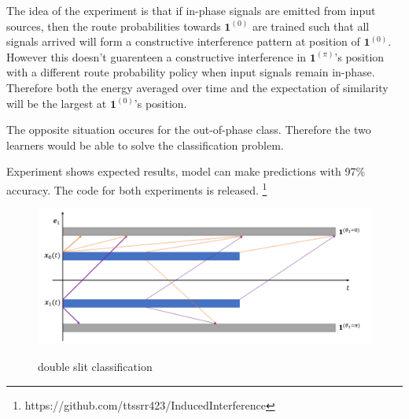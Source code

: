 \documentclass[11pt,a4paper]{article}
\begin{document}
\begin{multicols}{2}
  The idea of the experiment is that if in-phase signals are emitted from input sources, then the route probabilities towards $\boldsymbol{1}^{(0)}$ are trained such that all signals arrived will form a constructive interference pattern at position of $\boldsymbol{1}^{(0)}$. 
  However this doesn't guarenteen a constructive interference in $\boldsymbol{1}^{(\pi)}$'s position with a different route probability policy when input signals remain in-phase. 
  Therefore both the energy averaged over time and the expectation of similarity will be the largest at $\boldsymbol{1}^{(0)}$'s position. 

  The opposite situation occures for the out-of-phase class. Therefore the two learners would be able to solve the classification problem. 

  Experiment shows expected results, model can make predictions with 97\% accuracy.
  The code for both experiments is released. \footnote{https://github.com/ttssrr423/InducedInterference}
\end{multicols}

\begin{figure}
  {\includegraphics[width=1.0\linewidth]{fig/double-slit.png}}
  \caption{double slit classification}\label{fig:double-slit}
\end{figure}

\clearpage
\end{document}
